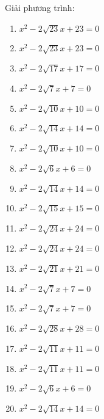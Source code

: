 \documentclass[12pt,a4paper]{article}
\begin{document}
\begin{ex}
	Giải phương trình:
	\begin{enumerate}
		\item ${x^2 - 2\sqrt{23}x+23}=0$
		\item ${x^2 - 2\sqrt{23}x+23}=0$
		\item ${x^2 - 2\sqrt{17}x+17}=0$
		\item ${x^2 - 2\sqrt{7}x+7}=0$
		\item ${x^2 - 2\sqrt{10}x+10}=0$
		\item ${x^2 - 2\sqrt{14}x+14}=0$
		\item ${x^2 - 2\sqrt{10}x+10}=0$
		\item ${x^2 - 2\sqrt{6}x+6}=0$
		\item ${x^2 - 2\sqrt{14}x+14}=0$
		\item ${x^2 - 2\sqrt{15}x+15}=0$
		\item ${x^2 - 2\sqrt{24}x+24}=0$
		\item ${x^2 - 2\sqrt{24}x+24}=0$
		\item ${x^2 - 2\sqrt{21}x+21}=0$
		\item ${x^2 - 2\sqrt{7}x+7}=0$
		\item ${x^2 - 2\sqrt{7}x+7}=0$
		\item ${x^2 - 2\sqrt{28}x+28}=0$
		\item ${x^2 - 2\sqrt{11}x+11}=0$
		\item ${x^2 - 2\sqrt{11}x+11}=0$
		\item ${x^2 - 2\sqrt{6}x+6}=0$
		\item ${x^2 - 2\sqrt{14}x+14}=0$
	\end{enumerate}
\end{ex}
	
	
	
	
	
	
	
\end{document}
